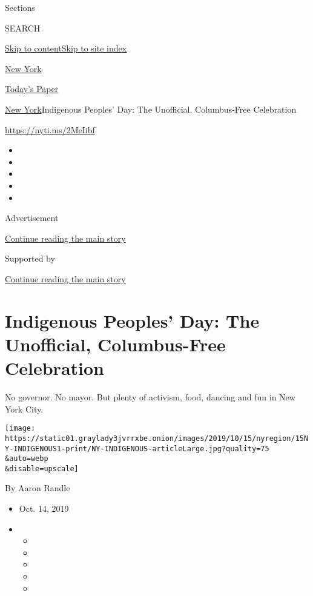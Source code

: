 Sections

SEARCH

\protect\hyperlink{site-content}{Skip to
content}\protect\hyperlink{site-index}{Skip to site index}

\href{https://www.nytimes3xbfgragh.onion/section/nyregion}{New York}

\href{https://myaccount.nytimes3xbfgragh.onion/auth/login?response_type=cookie\&client_id=vi}{}

\href{https://www.nytimes3xbfgragh.onion/section/todayspaper}{Today's
Paper}

\href{/section/nyregion}{New York}\textbar{}Indigenous Peoples' Day: The
Unofficial, Columbus-Free Celebration

\url{https://nyti.ms/2MeIibf}

\begin{itemize}
\item
\item
\item
\item
\item
\end{itemize}

Advertisement

\protect\hyperlink{after-top}{Continue reading the main story}

Supported by

\protect\hyperlink{after-sponsor}{Continue reading the main story}

\hypertarget{indigenous-peoples-day-the-unofficial-columbus-free-celebration}{%
\section{Indigenous Peoples' Day: The Unofficial, Columbus-Free
Celebration}\label{indigenous-peoples-day-the-unofficial-columbus-free-celebration}}

No governor. No mayor. But plenty of activism, food, dancing and fun in
New York City.

\texttt{[image: https://static01.graylady3jvrrxbe.onion/images/2019/10/15/nyregion/15NY-INDIGENOUS1-print/NY-INDIGENOUS-articleLarge.jpg?quality=75\\\&auto=webp\\\&disable=upscale]}

By Aaron Randle

\begin{itemize}
\item
  Oct. 14, 2019
\item
  \begin{itemize}
  \item
  \item
  \item
  \item
  \item
  \end{itemize}
\end{itemize}


